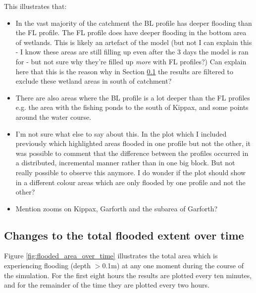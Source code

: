 \documentclass[APA,Times2COL]{WileyNJDv5}
\begin{document}
This illustrates that:
\begin{itemize}
    \item In the vast majority of the catchment the BL profile has deeper flooding than the FL profile. The FL profile does have deeper flooding in the bottom area of wetlands. This is likely an artefact of the model (but not I can explain this - I know these areas are still filling up even after the 3 days the model is ran for - but not sure why they're filled up \textit{more} with FL profiles?) Can explain here that this is the reason why in Section \ref{subsec:flood_over_time} the results are filtered to exclude these wetland areas in south of catchment?
    \item There are also areas where the BL profile is a lot deeper than the FL profiles e.g. the area with the fishing ponds to the south of Kippax, and some points around the water course. 
    \item I'm not sure what else to say about this. In the plot which I included previously which highlighted areas flooded in one profile but not the other, it was possible to comment that the difference between the profiles occurred in a distributed, incremental manner rather than in one big block. But not really possible to observe this anymore. I do wonder if the plot should show in a different colour areas which are only flooded by one profile and not the other?  
    \item Mention zooms on Kippax, Garforth and the subarea of Garforth? 
\end{itemize}

\subsection{Changes to the total flooded extent over time}\label{subsec:flood_over_time}

Figure \ref{fig:flooded_area_over_time} illustrates the total area which is experiencing flooding (depth $>$0.1m) at any one moment during the course of the simulation. For the first eight hours the results are plotted every ten minutes, and for the remainder of the time they are plotted every two hours. 
\end{document}
